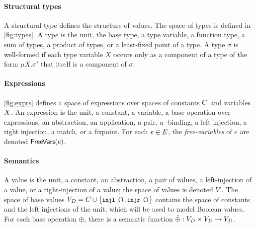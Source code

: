 \paragraph{Structural types}
%
A structural type defines the structure of values.
%
The space of types is defined in \autoref{fig:types}.
%
A type is the unit, the base type, a type variable, a function type, a
sum of types, a product of types, or a least-fixed point of a type.
%
A type $\sigma$ is well-formed if each type variable $X$ occurs only
as a component of a type of the form $\mu X. \sigma'$ that itself is a
component of $\sigma$.

\paragraph{Expressions}
\autoref{fig:exprs} defines a space of expressions over spaces of
constants $C$ and variables $X$.
An expression is the unit, a constant, a variable, a base operation
over expressions, an abstraction, an application, a pair, a
-binding, a left injection, a right injection, a match, or a
fixpoint.
%
For each $e \in E$, the \emph{free-variables} of $e$ are denoted
$\mathsf{FreeVars}(e)$.

\paragraph{Semantics}
%
A value is the unit, a constant, an abstraction, a pair of values, a
left-injection of a value, or a right-injection of a value;
%
the space of values is denoted $V$.
%
The space of base values
$\basevals = \consts \union \elts{ \injl\ \cc{()}, \injr\ \cc{()}}$
contains the space of constants and the left injections of the unit,
which will be used to model Boolean values.
%
For each base operation $\oplus$, there is a semantic function
$\hat{\oplus} : V_D \times V_D \to V_D$.

